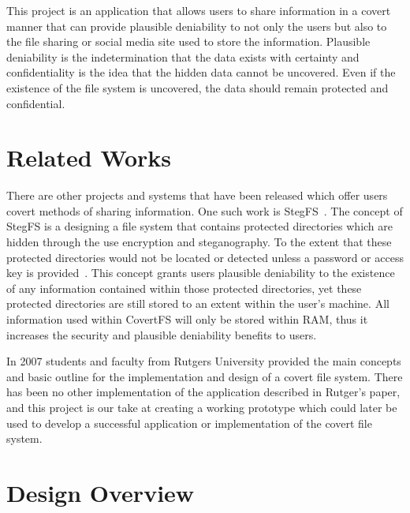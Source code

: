 \documentclass[12pt,journal,compsoc]{IEEEtran}
\begin{document}
This project is an application that allows users to share information in a covert manner that can provide plausible deniability to not only the users but also to the file sharing or social media site used to store the information. Plausible deniability is the indetermination that the data exists with certainty and confidentiality is the idea that the hidden data cannot be uncovered\cite{Baliga2007}. Even if the existence of the file system is uncovered, the data should remain protected and confidential. 

\section{Related Works}
There are other projects and systems that have been released which offer users covert methods of sharing information. One such work is StegFS~\cite{Tan2003}.  The concept of StegFS is a designing a file system that contains protected directories which are hidden through the use encryption and steganography. To the extent that these protected directories would not be located or detected unless a password or access key is provided~\cite{Tan2003}. This concept grants users plausible deniability to the existence of any information contained within those protected directories, yet these protected directories are still stored to an extent within the user's machine. All information used within CovertFS will only be stored within RAM, thus it increases the security and plausible deniability benefits to users.

In 2007 students and faculty from Rutgers University provided the main concepts and basic outline for the implementation and design of a covert file system\cite{Baliga2007}.  There has been no other implementation of the application described in Rutger's paper, and this project is our take at creating a working prototype which could later be used to develop a successful application or implementation of the covert file system.


\section{Design Overview}
\end{document}
